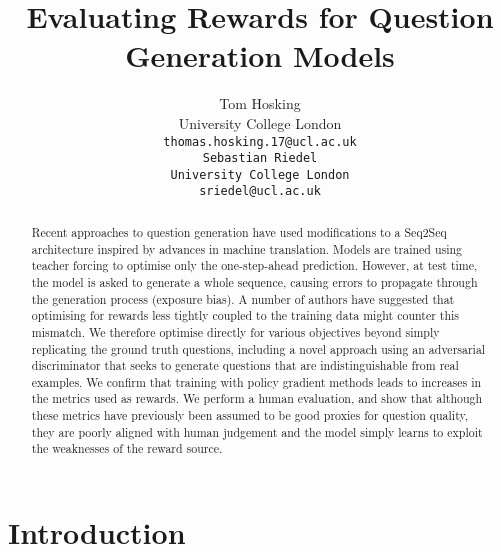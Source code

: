 \documentclass[11pt,a4paper]{article}
\title{Evaluating Rewards for Question Generation Models}
\author{Tom Hosking  \\
University College London \\
\tt{thomas.hosking.17@ucl.ac.uk} \\ \And
Sebastian Riedel\\
University College London \\
\tt{sriedel@ucl.ac.uk} \\
}
\date{}
\begin{document}
\maketitle
\begin{abstract}
  Recent approaches to question generation have used modifications to a Seq2Seq architecture inspired by advances in machine translation. Models are trained using teacher forcing to optimise only the one-step-ahead prediction.  However, at test time, the model is asked to generate a whole sequence, causing errors to propagate through the generation process (exposure bias). A number of authors have suggested that optimising for rewards less tightly coupled to the training data might counter this mismatch.
We therefore optimise directly for various objectives beyond simply replicating the ground truth questions, including a novel approach using an adversarial discriminator that seeks to generate questions that are indistinguishable from real examples. We confirm that training with policy gradient methods leads to increases in the metrics used as rewards. We perform a human evaluation, and show that although these metrics have previously been assumed to be good proxies for question quality, they are poorly aligned with human judgement and the model simply learns to exploit the weaknesses of the reward source.
\end{abstract}

\section{Introduction}
\end{document}
